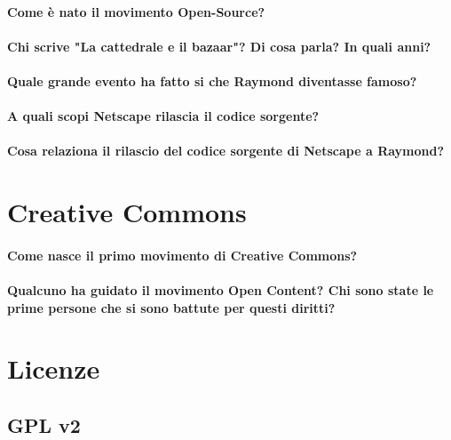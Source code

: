 \documentclass[a4paper]{article}
\begin{document}
		\paragraph{Come è nato il movimento Open-Source?}
		
		\paragraph{Chi scrive "La cattedrale e il bazaar"? Di cosa parla? In quali anni?}
		
		\paragraph{Quale grande evento ha fatto si che Raymond diventasse famoso?}
		
		\paragraph{A quali scopi Netscape rilascia il codice sorgente?}
		
		\paragraph{Cosa relaziona il rilascio del codice sorgente di Netscape a Raymond?}
		
		
	\section{Creative Commons}
	
		\paragraph{Come nasce il primo movimento di Creative Commons?}
		
		\paragraph{Qualcuno ha guidato il movimento Open Content? Chi sono state le prime persone che si sono battute per questi diritti?}
		
		
		
		
	\section{Licenze}
	
		\subsection{GPL v2}
		
\end{document}
